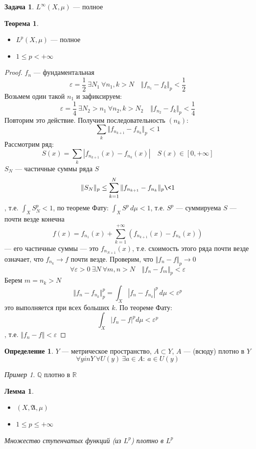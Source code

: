 \documentclass[oneside]{book}
\newcommand{\R}{\mathbb{R}}
\newcommand{\A}{\mathfrak{A}}
\theoremstyle{plain}
\newtheorem{lemma}{Лемма}
\theoremstyle{remark}
\newtheorem*{examp}{Пример}
\theoremstyle{definition}
\newtheorem{task}{Задача}
\newtheorem{theorem}{Теорема}[section]
\newtheorem*{definition}{Определение}
\begin{document}
\color{black}
\begin{task}
\(L^{\infty}(X, \mu)\) --- полное
\end{task}
\begin{theorem}
\-
\begin{itemize}
\item \(L^p(X, \mu)\) --- полное
\item \(1 \le p < +\infty\)
\end{itemize}
\end{theorem}
\begin{proof}
\(f_n\) --- фундаментальная
\[ \varepsilon = \frac{1}{2}\ \exists N_1\ \forall n_1, k > N\quad \Vert f_{n_1} - f_k \Vert_p < \frac{1}{2} \]
Возьмем один такой \(n_1\) и зафиксируем:
\[ \varepsilon = \frac{1}{4}\ \exists N_2 > n_1\ \forall n_2, k > N_2\quad \Vert f_{n_2} - f_k \Vert_p < \frac{1}{4} \]
Повторим это действие. Получим последовательность \((n_k)\):
\[ \sum_k \Vert f_{n_{k + 1}} - f_{n_k} \Vert_p < 1 \]
Рассмотрим ряд:
\[S(x) = \sum_k |f_{n_{k + 1}}(x) - f_{n_k}(x) |\quad S(x) \in [0, +\infty]\]
\(S_N\) --- частичные суммы ряда \(S\)
\[ \Vert S_N \Vert_p \le \sum_{k = 1}^N \Vert f_{n_{k + 1}} - f_{n_k} \Vert_p \< 1 \]
, т.е. \(\int_X S_N^p < 1\), по теореме Фату: \(\int_X S^p\,d\mu < 1\), т.е. \(S^p\) --- суммируема \implies \(S\) --- почти везде конечна 
\[ f(x) = f_{n_1}(x) + \sum_{k = 1}^{+\infty} (f_{n_{k + 1}}(x) - f_{n_k}(x)) \]
--- его частичные суммы --- это \(f_{n_{N + 1}}(x)\), т.е. схоимость этого ряда почти везде означает, что \(f_{n_k} \to f\) почти везде. Проверим, что \(\Vert f_n - f \Vert_p \to 0\)
\[ \forall \varepsilon > 0\ \exists N\ \forall m,n > N\quad \Vert f_n - f_m \Vert_p < \varepsilon \]
Берем \(m = n_k > N\)
\[ \Vert f_n - f_{n_k} \Vert_p^p = \int_X |f_n - f_{n_k} | ^p\,d\mu < \varepsilon^p \]
это выполняется при всех больших \(k\). По теореме Фату:
\[ \int_X | f_n - f |^p d\mu < \varepsilon^p \]
, т.е. \(\Vert f_n - f \Vert < \varepsilon\)
\end{proof}
\begin{definition}
\(Y\) --- метрическое пространство, \(A \subset Y\), \(A\) --- (всюду) плотно в \(Y\)
\[ \forall y in Y\ \forall U(y)\ \exists a \in A:\ a\in U(y) \]
\end{definition}
\begin{examp}
\(\mathbb{Q}\) плотно в \(\R\)
\end{examp}
\begin{lemma}
\-
\begin{itemize}
\item \((X, \A, \mu)\)
\item \(1 \le p \le +\infty\)
\end{itemize}
Множество ступенчатых функций (из \(L^p\)) плотно в \(L^p\)
\end{lemma}
\end{document}
